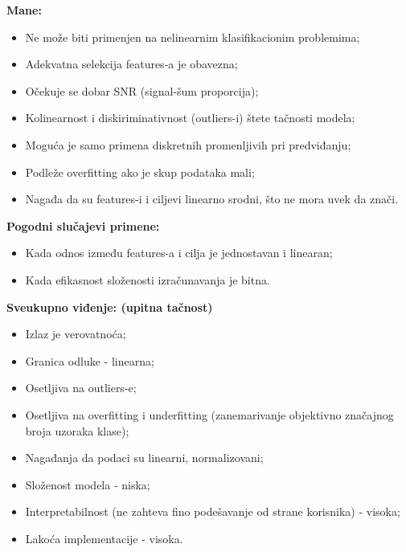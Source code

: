 \documentclass[fontsize=12bp, paper=a4]{scrarticle}
\begin{document}
\textbf{Mane:}
\begin{itemize}
    \item Ne može biti primenjen na nelinearnim klasifikacionim problemima;
    \item Adekvatna selekcija features-a je obavezna;
    \item Očekuje se dobar SNR (signal-šum proporcija);
    \item Kolinearnost i diskiriminativnost (outliers-i) štete tačnosti modela;
    \item Moguća je samo primena diskretnih promenljivih pri predviđanju;
    \item Podleže overfitting ako je skup podataka mali;
    \item Nagađa da su features-i i ciljevi linearno srodni, što ne mora uvek da znači.
\end{itemize}

\textbf{Pogodni slučajevi primene:}
\begin{itemize}
    \item Kada odnos između features-a i cilja je jednostavan i linearan;
    \item Kada efikasnost složenosti izračunavanja je bitna.
\end{itemize}

\textbf{Sveukupno viđenje: (upitna tačnost)}
\begin{itemize}
    \item Izlaz je verovatnoća;
    \item Granica odluke - linearna;
    \item Osetljiva na outliers-e;
    \item Osetljiva na overfitting i underfitting (zanemarivanje objektivno značajnog broja uzoraka klase)\cite{underfitting};
    \item Nagađanja da podaci su linearni, normalizovani;
    \item Složenost modela - niska;
    \item Interpretabilnost (ne zahteva fino podešavanje od strane korisnika)\cite{interoperability} - visoka;
    \item Lakoća implementacije - visoka.
\end{itemize}
 
\end{document}
